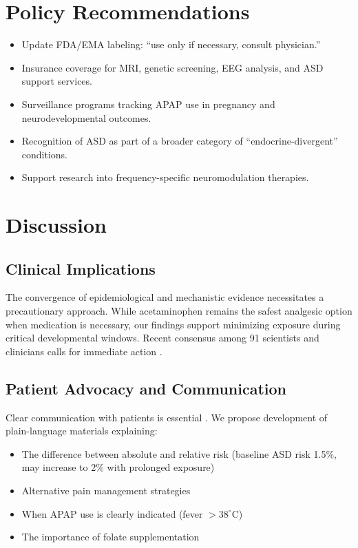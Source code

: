 \documentclass[12pt]{article}
\begin{document}
\section{Policy Recommendations}
\begin{itemize}
\item Update FDA/EMA labeling: ``use only if necessary, consult physician.''
\item Insurance coverage for MRI, genetic screening, EEG analysis, and ASD support services.
\item Surveillance programs tracking APAP use in pregnancy and neurodevelopmental outcomes.
\item Recognition of ASD as part of a broader category of ``endocrine-divergent'' conditions.
\item Support research into frequency-specific neuromodulation therapies.
\end{itemize}

\section{Discussion}

\subsection{Clinical Implications}
The convergence of epidemiological and mechanistic evidence \citep{navarro2025,bauer2021} necessitates a precautionary approach. While acetaminophen remains the safest analgesic option when medication is necessary, our findings support minimizing exposure during critical developmental windows. Recent consensus among 91 scientists and clinicians calls for immediate action \citep{bauer2021}.

\subsection{Patient Advocacy and Communication}
Clear communication with patients is essential \citep{leppert2019}. We propose development of plain-language materials explaining:
\begin{itemize}
\item The difference between absolute and relative risk (baseline ASD risk 1.5\%, may increase to 2\% with prolonged exposure) \citep{masarwa2018}
\item Alternative pain management strategies
\item When APAP use is clearly indicated (fever $>38^{\circ}$C)
\item The importance of folate supplementation \citep{leppert2019}
\end{itemize}
\end{document}
